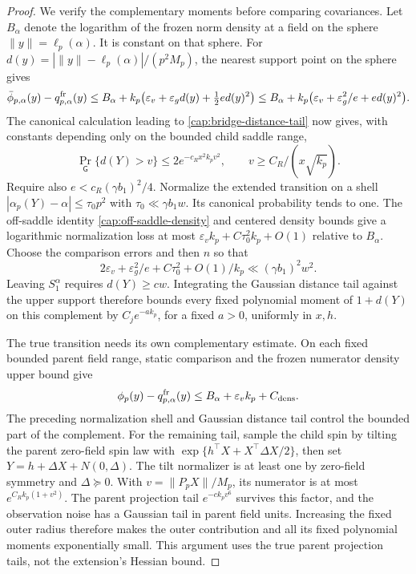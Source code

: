 \begin{proof}
We verify the complementary moments before comparing covariances. Let
\(B_\alpha\) denote the logarithm of the frozen norm density at a field
on the sphere \(\|y\|=\ell_p(\alpha)\). It is constant on that sphere.
For \(d(y)=|\|y\|-\ell_p(\alpha)|/(p^2M_p)\), the nearest support
point on the sphere gives
\[
 \bar\phi_{p,\alpha}(y)-q_{p,\alpha}^{\rm fr}(y)
 \le B_\alpha+k_p\bigl(\varepsilon_v+
                    \varepsilon_gd(y)+\tfrac12ed(y)^2\bigr)
 \le B_\alpha+k_p\bigl(\varepsilon_v+
                    \varepsilon_g^2/e+ed(y)^2\bigr).
\]
The canonical calculation leading to \eqref{cap:bridge-distance-tail}
now gives, with constants depending only on the bounded child saddle range,
\[
 \Pr_{\mathsf G}\{d(Y)>v\}\le2e^{-c_Rx^2k_pv^2},
 \qquad v\ge C_R/(x\sqrt{k_p}).
\]
Require also \(e<c_R(\gamma b_1)^2/4\). Normalize the
extended transition on a shell
\(|\alpha_p(Y)-\alpha|\le\tau_0p^2\) with
\(\tau_0\ll\gamma b_1w\). Its canonical probability tends to one.
The off-saddle identity \eqref{cap:off-saddle-density} and centered density
bounds give a logarithmic normalization loss at most
\(\varepsilon_vk_p+C\tau_0^2k_p+O(1)\) relative to \(B_\alpha\).
Choose the comparison errors and then \(n\) so that
\[
 2\varepsilon_v+\varepsilon_g^2/e+C\tau_0^2+O(1)/k_p
       \ll (\gamma b_1)^2w^2.
\]
Leaving \(S_1^\alpha\) requires \(d(Y)\ge c w\). Integrating the
Gaussian distance tail against the upper support therefore bounds every
fixed polynomial moment of \(1+d(Y)\) on this complement by
\(C_j e^{-a k_p}\), for a fixed \(a>0\), uniformly in \(x,h\).

The true transition needs its own complementary estimate. On each fixed
bounded parent field range, static comparison and the frozen numerator
density upper bound give
\[
 \phi_p(y)-q_{p,\alpha}^{\rm fr}(y)
       \le B_\alpha+\varepsilon_vk_p+C_{\rm dens}.
\]
The preceding normalization shell and Gaussian distance tail control the
bounded part of the complement. For the remaining tail, sample the child
spin by tilting the parent zero-field spin law with
\(\exp\{h^\top X+X^\top\Delta X/2\}\), then set
\(Y=h+\Delta X+N(0,\Delta)\). The tilt normalizer is at least one by
zero-field symmetry and \(\Delta\succeq0\). With
\(v=\|P_pX\|/M_p\), its numerator is at most
\(e^{C_R k_p(1+v^2)}\). The parent projection tail
\(e^{-ck_pv^6}\) survives this factor, and the observation noise has
a Gaussian tail in parent field units. Increasing the fixed outer radius
therefore makes the outer contribution and all its fixed polynomial
moments exponentially small. This argument uses the true parent projection
tails, not the extension's Hessian bound.


\end{proof}
